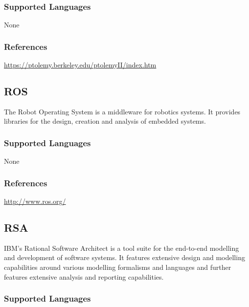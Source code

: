 \subsubsection{Supported Languages}

None


\subsubsection{References}

\url{https://ptolemy.berkeley.edu/ptolemyII/index.htm}


\subsection{ROS}
\label{subsecT:ROS}


The Robot Operating System is a middleware for robotics systems. 
It provides libraries for the design, creation and analysis of embedded systems.

\subsubsection{Supported Languages}

None


\subsubsection{References}

\url{http://www.ros.org/}



\subsection{RSA}
\label{subsecT:RSA}



IBM's Rational Software Architect is a tool suite for the end-to-end modelling and development of software systems.
It features extensive design and modelling capabilities around various modelling formalisms and languages and further features extensive analysis and reporting capabilities.

\subsubsection{Supported Languages}

